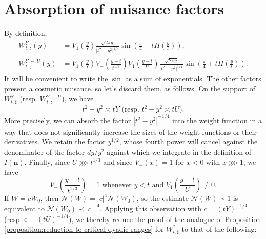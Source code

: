 \documentclass[reqno]{amsart} 
\begin{document}
\section{Absorption of nuisance factors}\label{sec:cqx50az7zk}
By definition,
\begin{align*}
  W _{t, \sharp}^Y(y) &= V_1\left(\frac{y}{Y}\right) \frac{\sqrt{2 \pi y}  }{ \lvert t^2 - y^2 \rvert ^{1/4}  }
                        \sin \left( \frac{\pi }{4} + t H \left( \frac{y}{t} \right) \right), \\
  W _{t, \sharp}^{Y,-,U}(y) &= V_1\left(\frac{y}{Y}\right)  V_{-} \left(\frac{y - t}{t ^{1/3} }\right)
  V_1 \left( \frac{y - t}{U} \right) \frac{\sqrt{2 \pi y}  }{ \lvert t^2 - y^2 \rvert ^{1/4}  }
                              \sin \left( \frac{\pi }{4} + t H \left( \frac{y}{t} \right) \right).
\end{align*}
It will be convenient to write the $\sin$ as a sum of exponentials.  The other factors present a cosmetic nuisance, so let's discard them, as follows.  On the support of $W_{t,\sharp}^Y$ (resp.  $W_{t,\sharp}^{Y,-,U}$), we have
\begin{equation*}
  \text{$t^2 - y^2 \asymp t Y$ (resp. $t^2 - y^2 \asymp t U$)}.
\end{equation*}
More precisely, we can absorb the factor $|t^2 - y^2|^{-1/4}$ into the weight function in a way that does not significantly increase the sizes of the weight functions or their derivatives.  We retain the factor $y^{1/2}$, whose fourth power will cancel against the denominator of the factor $d y / y^2$ against which we integrate in the definition of $I(\mathbf{n})$.  Finally, since $U \ggg t ^{1/3}$ and since $V_-(x) = 1$ for $x < 0$ with $x \ggg 1$, we have
\begin{equation*}
  V_- \left( \frac{y-t}{t ^{1/3} } \right) = 1 \text{ whenever } y < t \text{ and } V_1 \left( \frac{y - t}{U} \right) \neq 0.
\end{equation*}
If $W = c W_0$, then $\mathcal{N}(W) = |c|^4 \mathcal{N}(W_0)$, so the estimate $\mathcal{N}(W) \prec 1$ is equivalent to $\mathcal{N}(W_0) \prec |c|^{-4}$.  Applying this observation with $c = (t Y)^{-1/4}$ (resp. $c = (t U)^{-1/4}$), we thereby reduce the proof of the analogue of Proposition \ref{proposition:reduction-to-critical-dyadic-ranges} for $W_{t,\sharp}^{*}$ to that of the following:
\end{document}
